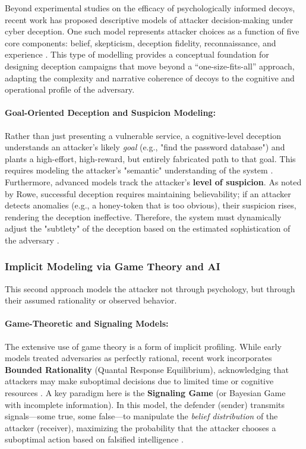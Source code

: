 Beyond experimental studies on the efficacy of psychologically informed decoys,
recent work has proposed descriptive models of attacker decision-making under
cyber deception. One such model represents attacker choices as a function of
five core components: belief, skepticism, deception fidelity, reconnaissance,
and experience \cite{attackerdecision2025}. This type of modelling provides a
conceptual foundation for designing deception campaigns that move beyond a
``one-size-fits-all'' approach, adapting the complexity and narrative coherence
of decoys to the cognitive and operational profile of the adversary.


\paragraph{Goal-Oriented Deception and Suspicion Modeling:} Rather than just presenting a vulnerable service,
a cognitive-level deception understands an attacker's likely \textit{goal} (e.g., "find the password database")
and plants a high-effort, high-reward, but entirely fabricated path to that goal. This requires modeling the
attacker's "semantic" understanding of the system \cite{han2018deception}. Furthermore, advanced models track the
attacker's \textbf{level of suspicion}. As noted by Rowe, successful deception requires maintaining believability;
if an attacker detects anomalies (e.g., a honey-token that is too obvious), their suspicion rises, rendering
the deception ineffective. Therefore, the system must dynamically adjust the "subtlety" of the deception based
on the estimated sophistication of the adversary \cite{rowe2016introduction}.

\subsubsection{Implicit Modeling via Game Theory and AI}
This second approach models the attacker not through psychology, but through their assumed rationality or observed behavior.

\paragraph{Game-Theoretic and Signaling Models:} The extensive use of game theory
is a form of implicit profiling. While early models treated adversaries as perfectly
rational, recent work incorporates \textbf{Bounded Rationality} (Quantal Response
Equilibrium), acknowledging that attackers may make suboptimal decisions due to
limited time or cognitive resources \cite{pawlick2019game}. A key paradigm here is
the \textbf{Signaling Game} (or Bayesian Game with incomplete information). In this
model, the defender (sender) transmits signals—some true, some false—to manipulate
the \textit{belief distribution} of the attacker (receiver), maximizing the
probability that the attacker chooses a suboptimal action based on falsified
intelligence \cite{pawlick2019game,carroll2011game}.

